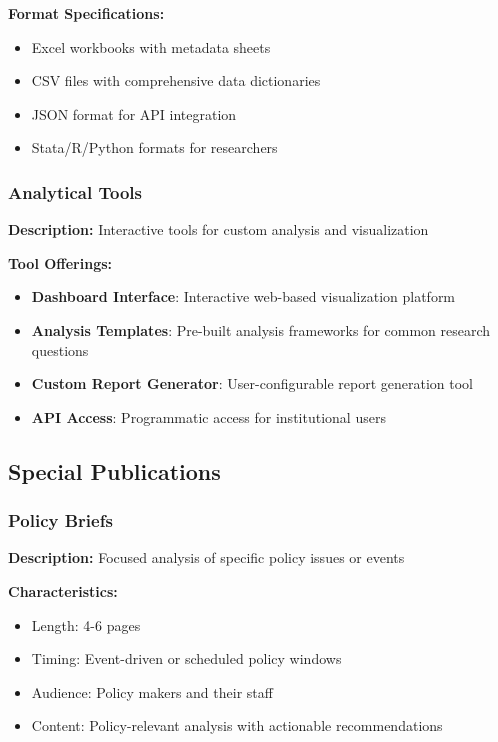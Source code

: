 \documentclass[11pt,a4paper]{article}
\begin{document}
\textbf{Format Specifications:}
\begin{itemize}
    \item Excel workbooks with metadata sheets
    \item CSV files with comprehensive data dictionaries
    \item JSON format for API integration
    \item Stata/R/Python formats for researchers
\end{itemize}

\subsubsection{Analytical Tools}
\textbf{Description:} Interactive tools for custom analysis and visualization

\textbf{Tool Offerings:}
\begin{itemize}
    \item \textbf{Dashboard Interface}: Interactive web-based visualization platform
    \item \textbf{Analysis Templates}: Pre-built analysis frameworks for common research questions
    \item \textbf{Custom Report Generator}: User-configurable report generation tool
    \item \textbf{API Access}: Programmatic access for institutional users
\end{itemize}

\subsection{Special Publications}

\subsubsection{Policy Briefs}
\textbf{Description:} Focused analysis of specific policy issues or events

\textbf{Characteristics:}
\begin{itemize}
    \item Length: 4-6 pages
    \item Timing: Event-driven or scheduled policy windows
    \item Audience: Policy makers and their staff
    \item Content: Policy-relevant analysis with actionable recommendations
\end{itemize}
\end{document}
